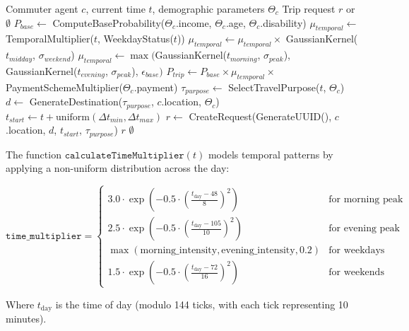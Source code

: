 \begin{algorithm}
\caption{Stochastic Trip Generation with Socioeconomic Stratification}
\label{alg:trip-generation}
\begin{algorithmic}[1]
\Require Commuter agent $c$, current time $t$, demographic parameters $\Theta_c$
\Ensure Trip request $r$ or $\emptyset$
\State $P_{base} \gets$ ComputeBaseProbability($\Theta_c$.income, $\Theta_c$.age, $\Theta_c$.disability)
\State $\mu_{temporal} \gets$ TemporalMultiplier($t$, WeekdayStatus($t$))
    \State $\mu_{temporal} \gets \mu_{temporal} \times$ GaussianKernel($t_{midday}$, $\sigma_{weekend}$)
\Else
    \State $\mu_{temporal} \gets \max($GaussianKernel($t_{morning}$, $\sigma_{peak}$), GaussianKernel($t_{evening}$, $\sigma_{peak}$), $\epsilon_{base})$
\EndIf
\State $P_{trip} \gets P_{base} \times \mu_{temporal} \times$ PaymentSchemeMultiplier($\Theta_c$.payment)
    \State $\tau_{purpose} \gets$ SelectTravelPurpose($t$, $\Theta_c$)
    \State $d \gets$ GenerateDestination($\tau_{purpose}$, $c$.location, $\Theta_c$)
    \State $t_{start} \gets t + \text{uniform}(\Delta t_{min}, \Delta t_{max})$
    \State $r \gets$ CreateRequest(GenerateUUID(), $c$.location, $d$, $t_{start}$, $\tau_{purpose}$)
    \State \Return $r$
\EndIf
\State \Return $\emptyset$
\end{algorithmic}
\end{algorithm}

The function $\texttt{calculateTimeMultiplier}(t)$ models temporal patterns by applying a non-uniform distribution across the day:

\begin{equation}
\texttt{time\_multiplier} = 
\begin{cases}
3.0 \cdot \exp\left(-0.5 \cdot \left(\frac{t_{\text{day}} - 48}{8}\right)^2\right) & \text{for morning peak} \\
2.5 \cdot \exp\left(-0.5 \cdot \left(\frac{t_{\text{day}} - 105}{10}\right)^2\right) & \text{for evening peak} \\
\max(\text{morning\_intensity}, \text{evening\_intensity}, 0.2) & \text{for weekdays} \\
1.5 \cdot \exp\left(-0.5 \cdot \left(\frac{t_{\text{day}} - 72}{16}\right)^2\right) & \text{for weekends}
\end{cases}
\end{equation}

Where $t_{\text{day}}$ is the time of day (modulo 144 ticks, with each tick representing 10 minutes).


